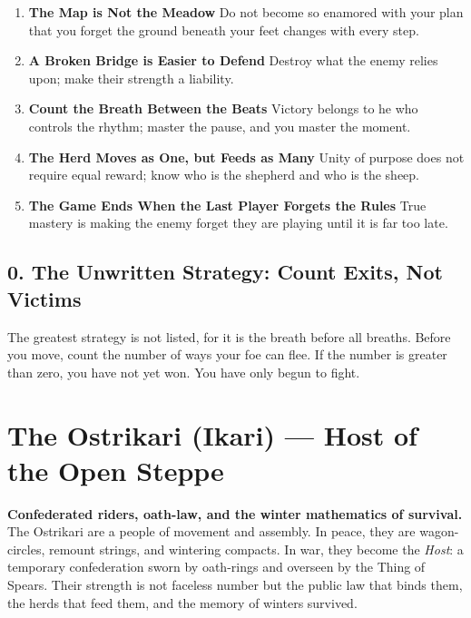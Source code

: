 \documentclass[11pt,letterpaper]{article}
\begin{document}
\begin{enumerate}
\item \textbf{The Map is Not the Meadow}
Do not become so enamored with your plan that you forget the ground beneath your feet changes with every step.

\item \textbf{A Broken Bridge is Easier to Defend}
Destroy what the enemy relies upon; make their strength a liability.

\item \textbf{Count the Breath Between the Beats}
Victory belongs to he who controls the rhythm; master the pause, and you master the moment.

\item \textbf{The Herd Moves as One, but Feeds as Many}
Unity of purpose does not require equal reward; know who is the shepherd and who is the sheep.

\item \textbf{The Game Ends When the Last Player Forgets the Rules}
True mastery is making the enemy forget they are playing until it is far too late.

\end{enumerate}

\subsection*{0. The Unwritten Strategy: Count Exits, Not Victims}
The greatest strategy is not listed, for it is the breath before all breaths. Before you move, count the number of ways your foe can flee. If the number is greater than zero, you have not yet won. You have only begun to fight.

\section{The Ostrikari (Ikari) --- Host of the Open Steppe}

\textbf{Confederated riders, oath-law, and the winter mathematics of survival.}\\
The Ostrikari are a people of movement and assembly. In peace, they are wagon-circles, remount strings, and wintering compacts. In war, they become the \emph{Host}: a temporary confederation sworn by oath-rings and overseen by the Thing of Spears. Their strength is not faceless number but the public law that binds them, the herds that feed them, and the memory of winters survived.
\end{document}
